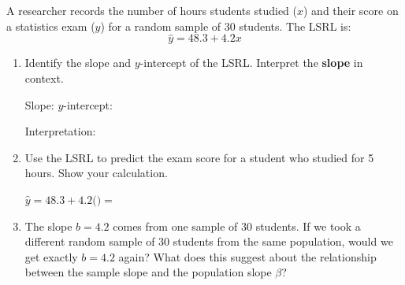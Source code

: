 \documentclass[10pt]{article}
\begin{document}
\namedateperiod

\vspace{0.15in}

A researcher records the number of hours students studied ($x$) and their score
on a statistics exam ($y$) for a random sample of 30 students. The LSRL is:
\[
    \hat{y} = 48.3 + 4.2x
\]

\begin{enumerate}

  \item Identify the slope and $y$-intercept of the LSRL. Interpret the
        \textbf{slope} in context.

        Slope: \blank{2cm} \quad $y$-intercept: \blank{2cm}

        \vspace{0.05in}
        Interpretation: \blank{9cm}

        \vspace{0.1in}
        \blank{11cm}

        \vspace{0.1in}

  \item Use the LSRL to predict the exam score for a student who studied
        for 5 hours. Show your calculation.

        \vspace{0.05in}
        $\hat{y} = 48.3 + 4.2($\blank{1.5cm}$) = $ \blank{2.5cm}

        \vspace{0.1in}

  \item The slope $b = 4.2$ comes from one sample of 30 students. If we took a
        different random sample of 30 students from the same population, would
        we get exactly $b = 4.2$ again? What does this suggest about the
        relationship between the sample slope and the population slope $\beta$?


\end{enumerate}
\end{document}
